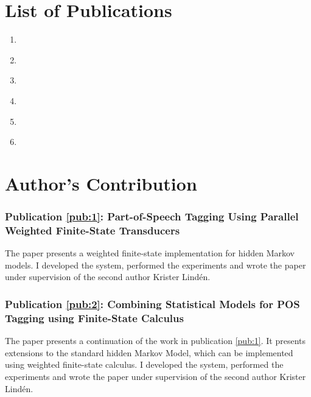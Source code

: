 \chapter*{List of Publications}
\nobibliography*
\begin{enumerate}[label=\textbf{\Roman*}]
\item\label{pub:1}\noindent{}\\[1cm]

\item\label{pub:2}\noindent{}\\[1cm]

\item\label{pub:3}\noindent{}\\[1cm]

\item\label{pub:4}\noindent{}\\[1cm]

\item\label{pub:5}\noindent{}\\[1cm]

\item\label{pub:6}\noindent{}
\end{enumerate}
\chapter*{Author's Contribution}
\subsection*{\bf Publication \ref{pub:1}: Part-of-Speech Tagging Using Parallel Weighted Finite-State Transducers}
\noindent The paper presents a weighted finite-state
implementation for hidden Markov models. I developed
the system, performed the experiments and wrote the paper under
supervision of the second author Krister Lind\'{e}n.

\subsection*{\bf Publication \ref{pub:2}: Combining Statistical Models for {POS} Tagging using Finite-State Calculus}
\noindent The paper presents a continuation of the work in publication
\ref{pub:1}. It presents extensions to the standard hidden Markov
Model, which can be implemented using weighted
finite-state calculus. I developed the system,
performed the experiments and wrote the paper under supervision of
the second author Krister Lind\'{e}n.

